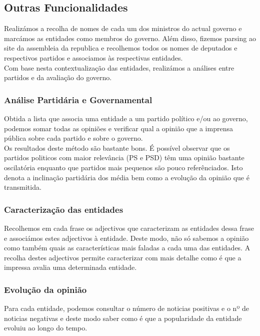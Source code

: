 \subsection{Outras Funcionalidades}
\hspace{15pt}Realizámos a recolha de nomes de cada um dos ministros do actual governo e marcámos as entidades como membros do governo. Além disso, fizemos parsing ao site da assembleia da republica e recolhemos todos os nomes de deputados e respectivos partidos e associamos às respectivas entidades.\\
Com base nesta contextualização das entidades, realizámos a análises entre partidos e da avaliação do governo.

\subsubsection{Análise Partidária e Governamental}%
Obtida a lista que associa uma entidade a um partido político e/ou ao governo, 
podemos somar todas as opiniões e verificar qual a opinião que a imprensa 
pública sobre cada partido e sobre o governo. \\
Os resultados deste método são bastante bons. É possível observar que os 
partidos politicos com maior relevância (PS e PSD) têm uma opinião bastante 
oscilatória enquanto que partidos mais pequenos são pouco referênciados. Isto 
denota a inclinação partidária dos média bem como a evolução da opinião que é 
transmitida.

\subsubsection{Caracterização das entidades}
\hspace{15pt}Recolhemos em cada frase os adjectivos que caracterizam as entidades dessa frase e associámos estes adjectivos à entidade. Deste modo, não só sabemos a opinião como também quais as características mais faladas a cada uma das 
entidades. A recolha destes adjectivos permite caracterizar com mais detalhe 
como é que a impressa avalia uma determinada entidade.

\subsubsection{Evolução da opinião}
\hspace{15pt}Para cada entidade, podemos consultar o número de noticias positivas e o nº de noticias negativas e deste modo saber como é que a popularidade da entidade evoluiu ao longo do tempo. 

